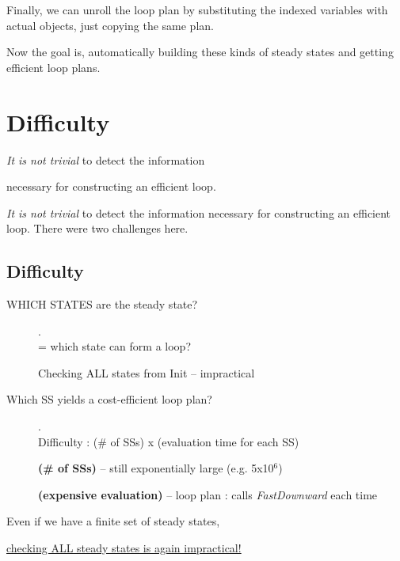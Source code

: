 \begin{resume}
Finally, we can unroll the loop plan by substituting
the indexed variables with actual objects,
just copying the same plan.

Now the goal is, automatically building these kinds of steady states and
getting efficient loop plans.
\end{resume}

\section{Difficulty}
\label{sec-6}

\begin{center}
\emph{It is not trivial} to detect the information

necessary for constructing an efficient loop.
\end{center}

\begin{resume}
\emph{It is not trivial} to detect the information
necessary for constructing an efficient loop.
There were two challenges here.
\end{resume}

\subsection{Difficulty}
\label{sec-6-1}

\begin{description}
\item[{WHICH STATES are the steady state?}] . \\
= which state can form a loop?

Checking ALL states from Init -- impractical
\item[{Which SS yields a cost-efficient loop plan?}] . \\
Difficulty : (\# of SSs) x (evaluation time for each SS)

\textbf{(\# of SSs)} -- still exponentially large (e.g. 5x10\(^{\text{6}}\))

\textbf{(expensive evaluation)} -- loop plan : calls \emph{FastDownward} each time
\end{description}

\begin{center}
Even if we have a finite set of steady states,

\uline{checking ALL steady states is again impractical!}
\end{center}


